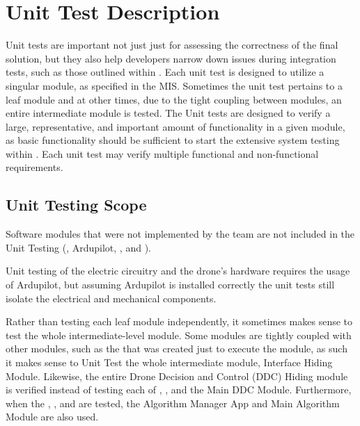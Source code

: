 \documentclass[12pt, titlepage]{article}
\begin{document}
\clearpage

\section{Unit Test Description}
\label{unitTest}

Unit tests are important not just just for assessing the correctness of the final solution, but they also help developers narrow down issues during integration tests, such as those outlined within . Each unit test is designed to utilize a singular module, as specified in the MIS. Sometimes the unit test pertains to a leaf module and at other times, due to the tight coupling between modules, an entire intermediate module is tested. The Unit tests are designed to verify a large, representative, and important amount of functionality in a given module, as basic functionality should be sufficient to start the extensive system testing within . Each unit test may verify multiple functional and non-functional requirements.

\subsection{Unit Testing Scope}

Software modules that were not implemented by the team are not included in the Unit Testing (, Ardupilot, , and ). 
 


Unit testing of the electric circuitry and the drone's hardware requires the usage of Ardupilot, but assuming Ardupilot is installed correctly the unit tests still isolate the electrical and mechanical components.


Rather than testing each leaf module independently, it sometimes makes sense to test the whole intermediate-level module. Some modules are tightly coupled with other modules, such as the  that was created just to execute the  module, as such it makes sense to Unit Test the whole intermediate module, Interface Hiding Module. Likewise, the entire Drone Decision and Control (DDC) Hiding module is verified instead of testing each of , , and the Main DDC Module. Furthermore, when the , , and  are tested, the Algorithm Manager App and Main Algorithm Module are also used. 
\end{document}
